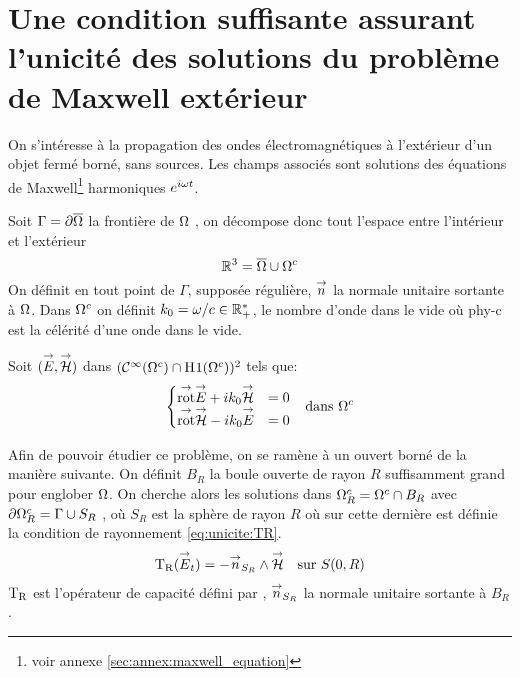 \section[Une CSU des solutions du problème de Maxwell extérieur]{Une condition suffisante assurant l'unicité des solutions du problème de Maxwell extérieur}

  On s’intéresse à la propagation des ondes électromagnétiques à l'extérieur d'un objet fermé borné, sans sources. Les champs associés sont solutions des équations de Maxwell\footnote{voir annexe \ref{sec:annex:maxwell_equation}} harmoniques \(e^{i\w t}\).

  Soit \(\Gamma=\partial\overline{\OO}\) la frontière de \(\OO\) , on décompose donc tout l'espace entre l'intérieur et l'extérieur 
  \[
    \RR^3 = \overline{\OO}\cup{\OO}^c
  \]
  On définit en tout point de \(\Gamma\), supposée régulière, \(\vn\) la normale unitaire sortante à \(\OO\).
  Dans \(\OO^c\) on définit \(k_0=\w / c \in \RR_+^*\), le nombre d'onde dans le vide où \gls{phy-c} est la célérité d'une onde dans le vide.

  Soit \((\vE,\vH)\) dans \((\mathcal{C}^\infty(\OO^c)\cap\Sobolev[1](\OO^c))^2\) tels que:
  \begin{align}
  \left\lbrace
    \begin{matrix}
      \trot \vE + i k_0 \vH &= 0
      \\
      \trot \vH - i k_0 \vE &= 0
    \end{matrix}
    \right. && \text{dans \(\OO^c\)}
    \label{eq:unicite:maxwell_ext}
  \end{align}


  Afin de pouvoir étudier ce problème, on se ramène à un ouvert borné de la manière suivante. On définit \(B_R\) la boule ouverte de rayon \(R\) suffisamment grand pour englober \(\OO\). On cherche alors les solutions dans \(\OO^c_R=\OO^c\cap B_R\) avec \(\partial\OO^c_R = \Gamma\cup S_R\) , où \(S_R\) est la sphère de rayon \(R\) où sur cette dernière est définie la condition de rayonnement \eqref{eq:unicite:TR}.
  \begin{equation}
    \label{eq:unicite:TR}
    \begin{aligned}
    \Tr(\vE_t) = - \vn_{S_R} \pvect \vH && \text{sur \(S(0,R)\)}
    \end{aligned}
  \end{equation}
  \(\Tr\) est l'opérateur de capacité défini par \cite[p.~200]{nedelec_acoustic_2001}, \(\vn_{S_R}\) la normale unitaire sortante à \(B_R\).

